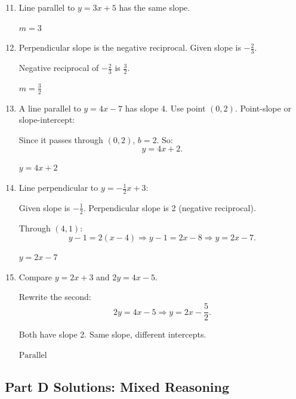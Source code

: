 \documentclass[14pt]{extarticle}
\begin{document}
\begin{enumerate}
  \setcounter{enumi}{10}
  \item Line parallel to \(y = 3x + 5\) has the same slope.

  \(\boxed{m = 3}\)

  \item Perpendicular slope is the negative reciprocal.  
  Given slope is \(-\tfrac{2}{3}.\)

  Negative reciprocal of \(-\tfrac{2}{3}\) is \(\tfrac{3}{2}.\)

  \(\boxed{m = \tfrac{3}{2}}\)

  \item A line parallel to \(y = 4x - 7\) has slope 4.  
  Use point \((0,2)\). Point-slope or slope-intercept:

  Since it passes through \((0,2)\), \(b = 2\). So:
  \[
  y = 4x + 2.
  \]

  \(\boxed{y = 4x + 2}\)

  \item Line perpendicular to \(y = -\tfrac{1}{2}x + 3\):

  Given slope is \(-\tfrac{1}{2}.\)  
  Perpendicular slope is 2 (negative reciprocal).

  Through \((4,1)\):
  \[
  y - 1 = 2(x - 4)
  \Rightarrow y - 1 = 2x - 8
  \Rightarrow y = 2x - 7.
  \]

  \(\boxed{y = 2x - 7}\)

  \item Compare \(y = 2x + 3\) and \(2y = 4x - 5.\)

  Rewrite the second:
  \[
  2y = 4x - 5 \Rightarrow y = 2x - \frac{5}{2}.
  \]

  Both have slope 2. Same slope, different intercepts.

  \(\boxed{\text{Parallel}}\)
\end{enumerate}

\subsection*{Part D Solutions: Mixed Reasoning}
\end{document}
